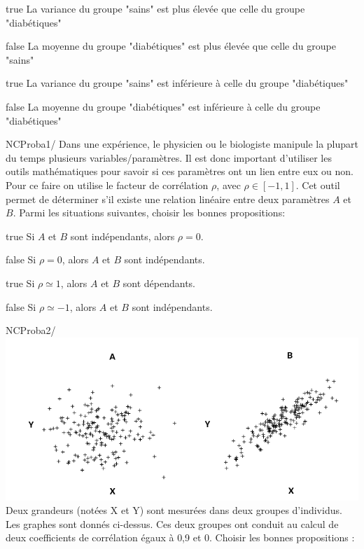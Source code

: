             \begin{reponses}
            	\item[true]  La variance du groupe "sains" est plus élevée que celle du groupe "diabétiques"
            	\item[false] La moyenne du groupe "diabétiques" est plus élevée que celle du groupe "sains"
                \item[true]  La variance du groupe "sains" est inférieure à celle du groupe "diabétiques"
                \item[false] La moyenne du groupe "diabétiques"  est inférieure à celle du groupe "diabétiques"
            \end{reponses}
			 \begin{question}{NC}{Proba}{1}{/} 
 				Dans une expérience, le physicien ou le biologiste manipule la plupart du temps plusieurs variables/paramètres. Il est donc important d'utiliser les outils mathématiques pour savoir si ces paramètres ont un lien entre eux ou non. Pour ce faire on utilise le facteur de corrélation $\rho$, avec $\rho\in [-1,1]$. Cet outil permet de déterminer s'il existe une relation linéaire entre deux paramètres $A$ et $B$. Parmi les situations suivantes, choisir les bonnes propositions: 
            \end{question}
            \begin{reponses}
            	\item[true]  Si $A$ et $B$ sont indépendants, alors $\rho =0 $.
            	\item[false] Si $\rho =0 $, alors $A$ et $B$ sont indépendants.
                \item[true]  Si $\rho \simeq 1 $, alors $A$ et $B$ sont dépendants.
                \item[false] Si $\rho \simeq -1 $, alors $A$ et $B$ sont indépendants.
            \end{reponses}
			\begin{question}{NC}{Proba}{2}{/} 
            \includegraphics[width=\textwidth]{Christopher/Figures_Christopher/correlation_UE.png}
 				Deux grandeurs (notées X et Y) sont mesurées dans deux groupes d’individus. Les graphes sont donnés ci-dessus. Ces deux groupes ont conduit au calcul de deux coefficients de corrélation égaux à 0,9 et 0. Choisir les bonnes propositions : 
            \end{question}
